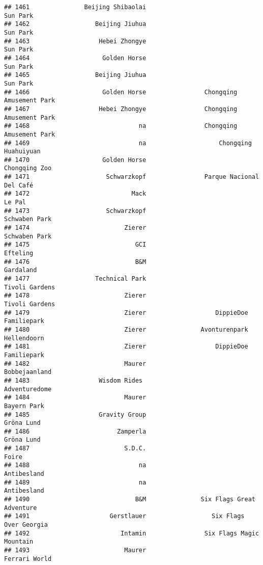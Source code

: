 \documentclass[
]{article}
\begin{document}
\begin{verbatim}
## 1461               Beijing Shibaolai                                Sun Park
## 1462                  Beijing Jiuhua                                Sun Park
## 1463                   Hebei Zhongye                                Sun Park
## 1464                    Golden Horse                                Sun Park
## 1465                  Beijing Jiuhua                                Sun Park
## 1466                    Golden Horse                Chongqing Amusement Park
## 1467                   Hebei Zhongye                Chongqing Amusement Park
## 1468                              na                Chongqing Amusement Park
## 1469                              na                    Chongqing Huahuiyuan
## 1470                    Golden Horse                           Chongqing Zoo
## 1471                     Schwarzkopf                Parque Nacional Del Café
## 1472                            Mack                                  Le Pal
## 1473                     Schwarzkopf                           Schwaben Park
## 1474                          Zierer                           Schwaben Park
## 1475                             GCI                                Efteling
## 1476                             B&M                               Gardaland
## 1477                  Technical Park                          Tivoli Gardens
## 1478                          Zierer                          Tivoli Gardens
## 1479                          Zierer                   DippieDoe Familiepark
## 1480                          Zierer               Avonturenpark Hellendoorn
## 1481                          Zierer                   DippieDoe Familiepark
## 1482                          Maurer                           Bobbejaanland
## 1483                   Wisdom Rides                            Adventuredome
## 1484                          Maurer                             Bayern Park
## 1485                   Gravity Group                              Gröna Lund
## 1486                        Zamperla                              Gröna Lund
## 1487                          S.D.C.                                   Foire
## 1488                              na                             Antibesland
## 1489                              na                             Antibesland
## 1490                             B&M               Six Flags Great Adventure
## 1491                      Gerstlauer                  Six Flags Over Georgia
## 1492                         Intamin                Six Flags Magic Mountain
## 1493                          Maurer                           Ferrari World

\end{verbatim}
\end{document}
